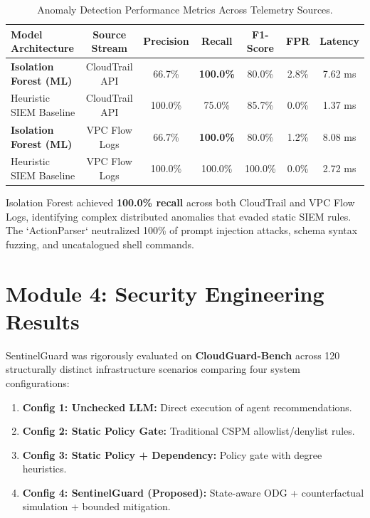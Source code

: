 \documentclass[12pt,a4paper]{report}
\begin{document}
\begin{table}[H]
\centering
\small
\caption{Anomaly Detection Performance Metrics Across Telemetry Sources.}
\label{tab:ml_detection_metrics}
\begin{tabular*}{\linewidth}{@{\extracolsep{\fill}}lcccccc}
\toprule
\textbf{Model Architecture} & \textbf{Source Stream} & \textbf{Precision} & \textbf{Recall} & \textbf{F1-Score} & \textbf{FPR} & \textbf{Latency} \\
\midrule
\textbf{Isolation Forest (ML)} & CloudTrail API & 66.7\% & \textbf{100.0\%} & 80.0\% & 2.8\% & 7.62 ms \\
Heuristic SIEM Baseline & CloudTrail API & 100.0\% & 75.0\% & 85.7\% & 0.0\% & 1.37 ms \\
\textbf{Isolation Forest (ML)} & VPC Flow Logs & 66.7\% & \textbf{100.0\%} & 80.0\% & 1.2\% & 8.08 ms \\
Heuristic SIEM Baseline & VPC Flow Logs & 100.0\% & 100.0\% & 100.0\% & 0.0\% & 2.72 ms \\
\bottomrule
\end{tabular*}
\end{table}

Isolation Forest achieved \textbf{100.0\% recall} across both CloudTrail and VPC Flow Logs, identifying complex distributed anomalies that evaded static SIEM rules. The `ActionParser` neutralized 100\% of prompt injection attacks, schema syntax fuzzing, and uncatalogued shell commands.

\section{Module 4: Security Engineering Results}\label{sec:eval_se}
SentinelGuard was rigorously evaluated on \textbf{CloudGuard-Bench} across 120 structurally distinct infrastructure scenarios comparing four system configurations:
\begin{enumerate}
    \item \textbf{Config 1: Unchecked LLM:} Direct execution of agent recommendations.
    \item \textbf{Config 2: Static Policy Gate:} Traditional CSPM allowlist/denylist rules.
    \item \textbf{Config 3: Static Policy + Dependency:} Policy gate with degree heuristics.
    \item \textbf{Config 4: SentinelGuard (Proposed):} State-aware ODG + counterfactual simulation + bounded mitigation.
\end{enumerate}
\end{document}
